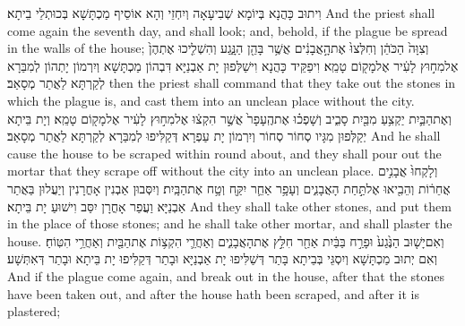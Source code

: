 {וִיתוּב כָּהֲנָא בְּיוֹמָא שְׁבִיעָאָה וְיִחְזֵי וְהָא אוֹסֵיף מַכְתָּשָׁא בְּכוּתְלֵי בֵיתָא׃}
{And the priest shall come again the seventh day, and shall look; and, behold, if the plague be spread in the walls of the house;}{}
{וְצִוָּה֙ הַכֹּהֵ֔ן וְחִלְּצוּ֙ אֶת\maqqaf הָ֣אֲבָנִ֔ים אֲשֶׁ֥ר בָּהֵ֖ן הַנָּ֑גַע וְהִשְׁלִ֤יכוּ אֶתְהֶן֙ אֶל\maqqaf מִח֣וּץ לָעִ֔יר אֶל\maqqaf מָק֖וֹם טָמֵֽא׃}
{וִיפַקֵּיד כָּהֲנָא וִישַׁלְּפוּן יָת אַבְנַיָּא דִּבְהוֹן מַכְתָּשָׁא וְיִרְמוֹן יָתְהוֹן לְמִבַּרָא לְקַרְתָּא לַאֲתַר מְסָאַב׃}
{then the priest shall command that they take out the stones in which the plague is, and cast them into an unclean place without the city.}{}
{וְאֶת\maqqaf הַבַּ֛יִת יַקְצִ֥עַ מִבַּ֖יִת סָבִ֑יב וְשָׁפְכ֗וּ אֶת\maqqaf הֶֽעָפָר֙ אֲשֶׁ֣ר הִקְצ֔וּ אֶל\maqqaf מִח֣וּץ לָעִ֔יר אֶל\maqqaf מָק֖וֹם טָמֵֽא׃}
{וְיָת בֵּיתָא יְקַלְּפוּן מִגָּיו סְחוֹר סְחוֹר וְיִרְמוֹן יָת עַפְרָא דְּקַלִּיפוּ לְמִבַּרָא לְקַרְתָּא לַאֲתַר מְסָאַב׃}
{And he shall cause the house to be scraped within round about, and they shall pour out the mortar that they scrape off without the city into an unclean place.}{}
{וְלָקְחוּ֙ אֲבָנִ֣ים אֲחֵר֔וֹת וְהֵבִ֖יאוּ אֶל\maqqaf תַּ֣חַת הָאֲבָנִ֑ים וְעָפָ֥ר אַחֵ֛ר יִקַּ֖ח וְטָ֥ח אֶת\maqqaf הַבָּֽיִת׃}
{וְיִסְּבוּן אַבְנִין אָחֳרָנִין וְיַעֲלוּן בַּאֲתַר אַבְנַיָּא וַעֲפַר אָחֳרָן יִסַּב וִישׁוּעַ יָת בֵּיתָא׃}
{And they shall take other stones, and put them in the place of those stones; and he shall take other mortar, and shall plaster the house.}{}
{וְאִם\maqqaf יָשׁ֤וּב הַנֶּ֙גַע֙ וּפָרַ֣ח בַּבַּ֔יִת אַחַ֖ר חִלֵּ֣ץ אֶת\maqqaf הָאֲבָנִ֑ים וְאַחֲרֵ֛י הִקְצ֥וֹת אֶת\maqqaf הַבַּ֖יִת וְאַחֲרֵ֥י הִטּֽוֹחַ׃}
{וְאִם יְתוּב מַכְתָּשָׁא וְיִסְגֵּי בְּבֵיתָא בָּתַר דְּשַׁלִּיפוּ יָת אַבְנַיָּא וּבָתַר דְּקַלִּיפוּ יָת בֵּיתָא וּבָתַר דְּאִתְּשָׁע׃}
{And if the plague come again, and break out in the house, after that the stones have been taken out, and after the house hath been scraped, and after it is plastered;}{}

